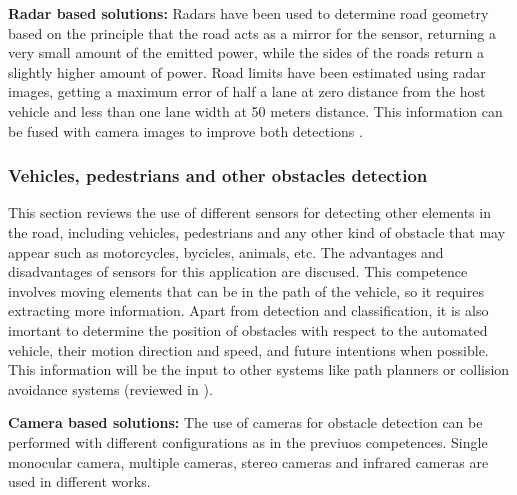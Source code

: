 \textbf{Radar based solutions:}
Radars have been used to determine road geometry based on the principle that the
road acts as a mirror for the sensor, returning a very small amount of the 
emitted power, while the sides of the roads return a slightly higher 
amount of power. Road limits have been estimated using radar images, getting a 
maximum error of half a lane at zero distance from the host vehicle and less 
than one lane width at 50 meters distance. This information can be fused with
camera images to improve both detections 
\cite{kaliyaperumal2001algorithm, ma2000simultaneous, Janda2013}.

\subsubsection{Vehicles, pedestrians and other obstacles detection}
This section reviews the use of different sensors for detecting other elements 
in the road, including vehicles, pedestrians and any other kind of obstacle 
that may appear such as motorcycles, bycicles, animals, etc. 
The advantages and disadvantages of sensors for this application are discused.
This competence involves moving elements that can be in the path of the 
vehicle, so it requires extracting more information. Apart from detection and 
classification, it is also imortant to determine the position of obstacles with 
respect to the automated vehicle, their motion direction and speed, and future 
intentions when possible. 
This information will be the input to other systems like path planners 
or collision avoidance systems (reviewed in \cite{mukhtar2015vehicle}).


\textbf{Camera based solutions:}
The use of cameras for obstacle detection can be performed with different 
configurations as in the previuos competences. Single monocular 
camera, multiple cameras, stereo cameras and infrared cameras are used in 
different works.

